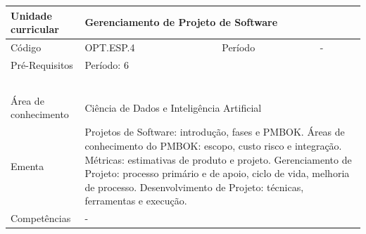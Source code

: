 \clearpage
\newpage

\begin{quadro}[ht!]
  \centering\scriptsize
\caption{Unidade Curricular Gerenciamento de Projeto de Software}

\begin{tabular}{|p{2.5cm}|p{2.5cm}|p{2.5cm}|p{2.5cm}|p{2.5cm}|}\hline

  Unidade curricular & \multicolumn{4}{p{10cm}|}{ Gerenciamento de Projeto de Software }\\\hline
  Código & OPT.ESP.4 & Período & \multicolumn{2}{p{5cm}|}{ - }\\\hline
  Pré-Requisitos & \multicolumn{4}{p{10cm}|}{ Período: 6 } \\\hline
  \cellcolor{blue1}{ CH PRESENCIAL } &
    \cellcolor{blue1}{CH EAD Síncrona} &
    \cellcolor{blue1}{CH EAD Síncrona Mediada} &
    \cellcolor{blue1}{CH EAD Assíncrona} &
    \cellcolor{blue1}{CH APCC} \\\hline
  \cellcolor{blue1}{ 60 } &
    \cellcolor{blue1}{ 0 } &
    \cellcolor{blue1}{ 30 } &
    \cellcolor{blue1}{ 30 } &
    \cellcolor{blue1}{0} \\\hline
  \cellcolor{blue1}{ CH Teórica } &
    \cellcolor{blue1}{CH Prática} &
    \cellcolor{blue1}{CH Humanidades} &
    \cellcolor{blue1}{CH Extensão} &
    \cellcolor{blue1}{CH EAD TOTAL} \\\hline
  \cellcolor{blue1}{ 30 } &
    \cellcolor{blue1}{ 30 } &
    \cellcolor{blue1}{ 0 } &
    \cellcolor{blue1}{ 0 } &
    \cellcolor{blue1}{ 60 } \\\hline
  \cellcolor{blue1}{CARGA-HORÁRIA TOTAL} & \multicolumn{4}{p{10cm}|}{ \cellcolor{blue1}{ 60 } } \\\hline
  Área de conhecimento & \multicolumn{4}{p{10cm}|}{ Ciência de Dados e Inteligência Artificial } \\\hline
  Ementa & \multicolumn{4}{p{10cm}|}{ Projetos de Software: introdução, fases e PMBOK. Áreas de conhecimento do PMBOK: escopo, custo risco e integração. Métricas: estimativas de produto e projeto. Gerenciamento de Projeto: processo primário e de apoio, ciclo de vida, melhoria de processo. Desenvolvimento de Projeto: técnicas, ferramentas e execução. } \\\hline
  Competências & \multicolumn{4}{p{10cm}|}{ - } \\\hline


  
	\end{tabular}

\end{quadro}


